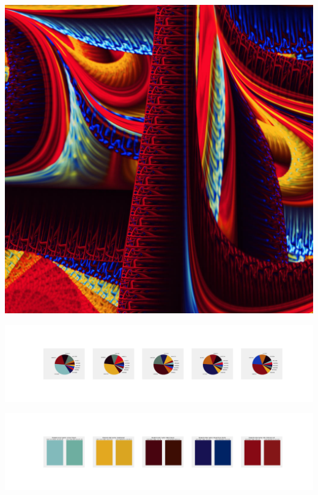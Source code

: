 \documentclass[11pt]{article}
\begin{document}
\begin{landscape}
    \begin{center}
    \includegraphics[width=\textwidth]{./nbimg/file (290).jpg}
    \end{center}

    \begin{center}
    \includegraphics[width=250mm]{./nbimg/pie-212.jpg}
    \end{center}

    \begin{center}
    \includegraphics[width=250mm]{./nbimg/peak-212.jpg}
    \end{center}
    


\end{landscape}
\end{document}

